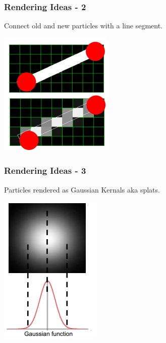 \documentclass[11pt]{article}
\begin{document}
  \subsubsection{Rendering Ideas - 2}
  Connect old and new particles with a line segment.
  \begin{center}
    \includegraphics[scale=0.9]{render2}
  \end{center}

  \subsubsection{Rendering Ideas - 3}
  Particles rendered as Gaussian Kernals aka splats.
  \begin{center}
    \includegraphics[scale=0.9]{render3}
  \end{center}
\end{document}
